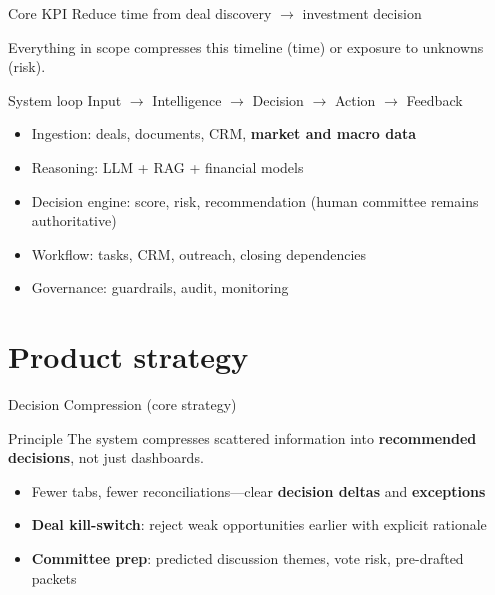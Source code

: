 \documentclass[aspectratio=169,11pt]{beamer}
\begin{document}
\begin{frame}{Core KPI}
  \centering
  \Large Reduce time from deal discovery $\rightarrow$ investment decision
  \vspace{1em}

  \normalsize
  Everything in scope compresses this timeline (time) or exposure to unknowns (risk).
\end{frame}

\begin{frame}{System loop}
  \small
  \centering
  Input $\rightarrow$ Intelligence $\rightarrow$ Decision $\rightarrow$ Action $\rightarrow$ Feedback
  \vspace{0.8em}

  \raggedright
  \begin{itemize}
    \item Ingestion: deals, documents, CRM, \textbf{market and macro data}
    \item Reasoning: LLM + RAG + financial models
    \item Decision engine: score, risk, recommendation (human committee remains authoritative)
    \item Workflow: tasks, CRM, outreach, closing dependencies
    \item Governance: guardrails, audit, monitoring
  \end{itemize}
\end{frame}

\section{Product strategy}

\begin{frame}{Decision Compression (core strategy)}
  \begin{block}{Principle}
    The system compresses scattered information into \textbf{recommended decisions}, not just dashboards.
  \end{block}
  \begin{itemize}
    \item Fewer tabs, fewer reconciliations---clear \textbf{decision deltas} and \textbf{exceptions}
    \item \textbf{Deal kill-switch}: reject weak opportunities earlier with explicit rationale
    \item \textbf{Committee prep}: predicted discussion themes, vote risk, pre-drafted packets
  \end{itemize}
\end{frame}
\end{document}
